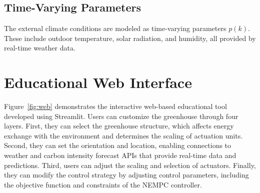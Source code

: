 \documentclass[conference]{IEEEtran}
\begin{document}
\subsection{Time-Varying Parameters}

The external climate conditions are modeled as time-varying parameters \( p(k) \). These include outdoor temperature, solar radiation, and humidity, all provided by real-time weather data.

\section{Educational Web Interface}
Figure~\ref{fig:web} demonstrates the interactive web-based educational tool developed using Streamlit. Users can customize the greenhouse through four layers. First, they can select the greenhouse structure, which affects energy exchange with the environment and determines the scaling of actuation units. Second, they can set the orientation and location, enabling connections to weather and carbon intensity forecast APIs that provide real-time data and predictions. Third, users can adjust the scaling and selection of actuators. Finally, they can modify the control strategy by adjusting control parameters, including the objective function and constraints of the NEMPC controller.
\end{document}
